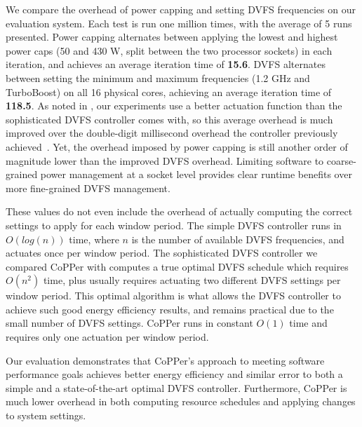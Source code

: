 We compare the overhead of power capping and setting DVFS frequencies on our evaluation system.
Each test is run one million times, with the average of 5 runs presented.
Power capping alternates between applying the lowest and highest power caps (50 and 430 W, split between the two processor sockets) in each iteration, and achieves an average iteration time of \textbf{15.6\us}.
DVFS alternates between setting the minimum and maximum frequencies (1.2 GHz and TurboBoost) on all 16 physical cores, achieving an average iteration time of \textbf{118.5\us}.
As noted in , our experiments use a better actuation function than the sophisticated DVFS controller comes with, so this average overhead is much improved over the double-digit millisecond overhead the controller previously achieved~\cite{POETMCSoC}.
Yet, the overhead imposed by power capping is still another order of magnitude lower than the improved DVFS overhead.
Limiting software to coarse-grained power management at a socket level provides clear runtime benefits over more fine-grained DVFS management.

These values do not even include the overhead of actually computing the correct settings to apply for each window period.
The simple DVFS controller runs in $O(log(n))$ time, where $n$ is the number of available DVFS frequencies, and actuates once per window period.
The sophisticated DVFS controller we compared CoPPer with computes a true optimal DVFS schedule which requires $O(n^2)$ time, plus usually requires actuating two different DVFS settings per window period.
This optimal algorithm is what allows the DVFS controller to achieve such good energy efficiency results, and remains practical due to the small number of DVFS settings.
CoPPer runs in constant $O(1)$ time and requires only one actuation per window period.


Our evaluation demonstrates that CoPPer's approach to meeting software performance goals achieves better energy efficiency and similar error to both a simple and a state-of-the-art optimal DVFS controller.
Furthermore, CoPPer is much lower overhead in both computing resource schedules and applying changes to system settings.
